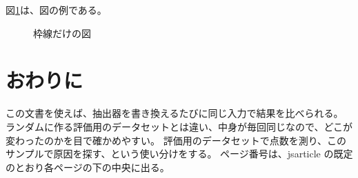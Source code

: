 \documentclass[uplatex,a4paper,11pt]{jsarticle}
\begin{document}
図\ref{fig:box}は、図の例である。
\begin{figure}[htbp]
  \centering
  \fbox{\rule{0pt}{3cm}\hspace{0.5\linewidth}}
  \caption{枠線だけの図}
  \label{fig:box}
\end{figure}

\section{おわりに}

この文書を使えば、抽出器を書き換えるたびに同じ入力で結果を比べられる。
ランダムに作る評価用のデータセットとは違い、中身が毎回同じなので、どこが変わったのかを目で確かめやすい。
評価用のデータセットで点数を測り、このサンプルで原因を探す、という使い分けをする。
ページ番号は、jsarticle の既定のとおり各ページの下の中央に出る。
\end{document}
